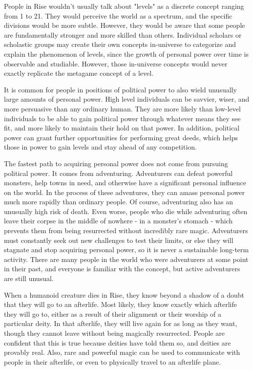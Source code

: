   People in Rise wouldn't usually talk about "levels" as a discrete concept ranging from 1 to 21.
  They would perceive the world as a spectrum, and the specific divisions would be more subtle.
  However, they would be aware that some people are fundamentally stronger and more skilled than others.
  Individual scholars or scholastic groups may create their own concepts in-universe to categorize and explain the phenomenon of levels, since the growth of personal power over time is observable and studiable.
  However, those in-universe concepts would never exactly replicate the metagame concept of a level.

  It is common for people in positions of political power to also wield unusually large amounts of personal power.
  High level individuals can be savvier, wiser, and more persuasive than any ordinary human.
  They are more likely than low-level individuals to be able to gain political power through whatever means they see fit, and more likely to maintain their hold on that power.
  In addition, political power can grant further opportunities for performing great deeds, which helps those in power to gain levels and stay ahead of any competition.

  The fastest path to acquiring personal power does not come from pursuing political power.
  It comes from adventuring.
  Adventurers can defeat powerful monsters, help towns in need, and otherwise have a significant personal influence on the world.
  In the process of these adventures, they can amass personal power much more rapidly than ordinary people.
  Of course, adventuring also has an unusually high risk of death.
  Even worse, people who die while adventuring often leave their corpse in the middle of nowhere - in a monster's stomach - which prevents them from being resurrected without incredibly rare magic.
  Adventurers must constantly seek out new challenges to test their limits, or else they will stagnate and stop acquiring personal power, so it is never a sustainable long-term activity.
  There are many people in the world who were adventurers at some point in their past, and everyone is familiar with the concept, but active adventurers are still unusual.


  When a humanoid creature dies in Rise, they know beyond a shadow of a doubt that they will go to an afterlife.
  Most likely, they know exactly which afterlife they will go to, either as a result of their alignment or their worship of a particular deity.
  In that afterlife, they will live again for as long as they want, though they cannot leave without being magically resurrected.
  People are confident that this is true because deities have told them so, and deities are provably real.
  Also, rare and powerful magic can be used to communicate with people in their afterlife, or even to physically travel to an afterlife plane.

